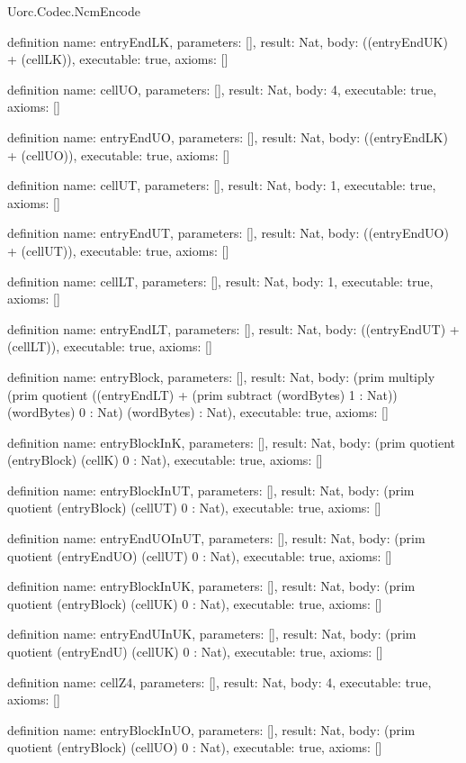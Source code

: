 \begin{lexlean}{Uorc.Codec.NcmEncode}
\begin{semanticmodule}
definition{
  name: entryEndLK,
  parameters: [],
  result: Nat,
  body: ((entryEndUK) + (cellLK)),
  executable: true,
  axioms: []
}

definition{
  name: cellUO,
  parameters: [],
  result: Nat,
  body: 4,
  executable: true,
  axioms: []
}

definition{
  name: entryEndUO,
  parameters: [],
  result: Nat,
  body: ((entryEndLK) + (cellUO)),
  executable: true,
  axioms: []
}

definition{
  name: cellUT,
  parameters: [],
  result: Nat,
  body: 1,
  executable: true,
  axioms: []
}

definition{
  name: entryEndUT,
  parameters: [],
  result: Nat,
  body: ((entryEndUO) + (cellUT)),
  executable: true,
  axioms: []
}

definition{
  name: cellLT,
  parameters: [],
  result: Nat,
  body: 1,
  executable: true,
  axioms: []
}

definition{
  name: entryEndLT,
  parameters: [],
  result: Nat,
  body: ((entryEndUT) + (cellLT)),
  executable: true,
  axioms: []
}

definition{
  name: entryBlock,
  parameters: [],
  result: Nat,
  body: (prim multiply (prim quotient ((entryEndLT) + (prim subtract (wordBytes) 1 : Nat)) (wordBytes) 0 : Nat) (wordBytes) : Nat),
  executable: true,
  axioms: []
}

definition{
  name: entryBlockInK,
  parameters: [],
  result: Nat,
  body: (prim quotient (entryBlock) (cellK) 0 : Nat),
  executable: true,
  axioms: []
}

definition{
  name: entryBlockInUT,
  parameters: [],
  result: Nat,
  body: (prim quotient (entryBlock) (cellUT) 0 : Nat),
  executable: true,
  axioms: []
}

definition{
  name: entryEndUOInUT,
  parameters: [],
  result: Nat,
  body: (prim quotient (entryEndUO) (cellUT) 0 : Nat),
  executable: true,
  axioms: []
}

definition{
  name: entryBlockInUK,
  parameters: [],
  result: Nat,
  body: (prim quotient (entryBlock) (cellUK) 0 : Nat),
  executable: true,
  axioms: []
}

definition{
  name: entryEndUInUK,
  parameters: [],
  result: Nat,
  body: (prim quotient (entryEndU) (cellUK) 0 : Nat),
  executable: true,
  axioms: []
}

definition{
  name: cellZ4,
  parameters: [],
  result: Nat,
  body: 4,
  executable: true,
  axioms: []
}

definition{
  name: entryBlockInUO,
  parameters: [],
  result: Nat,
  body: (prim quotient (entryBlock) (cellUO) 0 : Nat),
  executable: true,
  axioms: []
}


\end{semanticmodule}
\end{lexlean}
